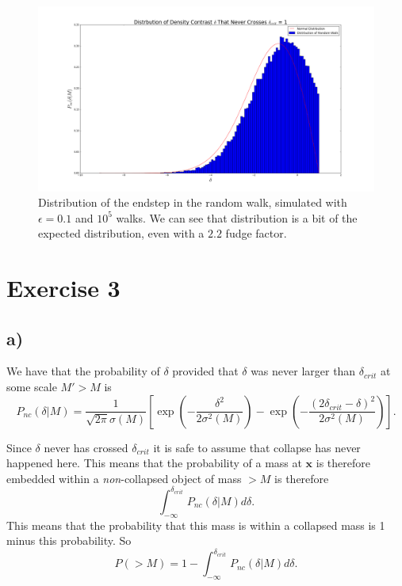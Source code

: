 \documentclass[a4paper,norsk, 10pt]{article}
\begin{document}
\begin{figure}[H]
\centering
\includegraphics[scale=0.3]{dist_under_crit}
\caption{Distribution of the endstep in the random walk, simulated with $\epsilon = 0.1$ and $10^5$ walks. We can see that distribution is a bit of the expected distribution, even with a $2.2$ fudge factor.}\label{fig:restricted_walk}
\end{figure}


\section{Exercise 3}

\subsection{a)}
We have that the probability of $\delta$ provided that $\delta$ was never larger than $\delta_{crit}$ at some scale $M' > M$ is
\begin{equation}\label{eq:Pnc}
P_{nc}(\delta|M) = \frac{1}{\sqrt{2\pi}\sigma(M)}\left[\exp\left(-\frac{\delta^2}{2\sigma^2 (M)}\right)-\exp\left(-\frac{(2\delta_{crit} - \delta)^2}{2\sigma^2 (M)}\right)\right].
\end{equation}

Since $\delta$ never has crossed $\delta_{crit}$ it is safe to assume that collapse has never happened here. This means that the probability of a mass at $\mathbf{x}$ is  therefore  embedded  within  a  \textit{non}-collapsed object of mass $>M$ is therefore
\begin{equation}
\int_{-\infty}^{\delta_{crit}} P_{nc}(\delta|M) d\delta.
\end{equation}
This means that the probability that this mass is within a collapsed mass is 1 minus this probability. So
\begin{equation}\label{eq:Pm}
P(>M) = 1 - \int_{-\infty}^{\delta_{crit}} P_{nc}(\delta|M) d\delta.
\end{equation}
\end{document}
